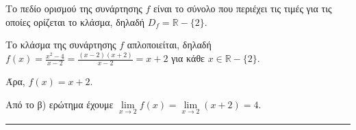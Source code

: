 \begin{alist}
\item Το πεδίο ορισμού της συνάρτησης $f$ είναι το σύνολο που περιέχει τις τιμές για τις οποίες ορίζεται το κλάσμα, δηλαδή $D_f = \mathbb{R} - \{2\}$.

\item Το κλάσμα της συνάρτησης $f$ απλοποιείται, δηλαδή $f(x) = \frac{x^2-4}{x-2} = \frac{(x-2)(x+2)}{x-2} = x + 2$ για κάθε $x \in \mathbb{R} - \{2\}$.

Άρα, $f(x) = x + 2$.

\item Από το β) ερώτημα έχουμε $\lim\limits_{x\to 2} f(x) = \lim\limits_{x\to 2}(x + 2) = 4$.
\end{alist}
\vspace{6mm}
\noindent\rule{\textwidth}{0.4pt}
\vspace{6mm}

